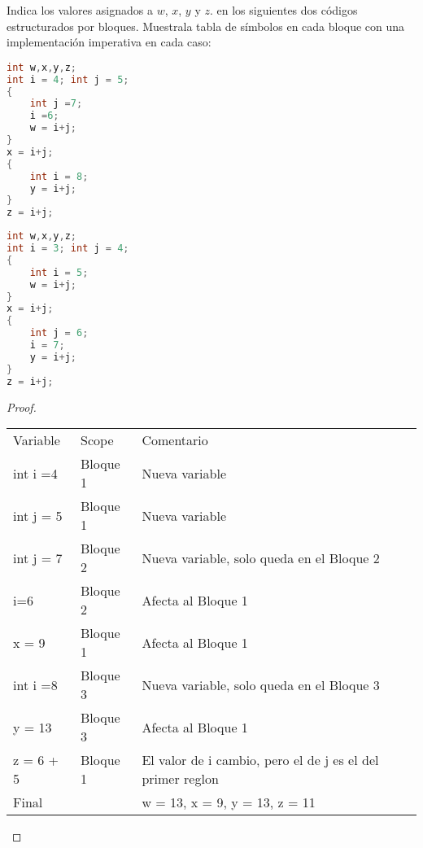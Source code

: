 \begin{Pro}
Indica los valores asignados a $w$, $x$, $y$ y $z$. en los siguientes dos códigos estructurados por bloques.
Muestrala tabla de símbolos en cada bloque con una implementación imperativa en cada caso:
\end{Pro}

\begin{multicols}{2}
\begin{lstlisting}[language=C++]
int w,x,y,z;
int i = 4; int j = 5;
{
    int j =7;
    i =6; 
    w = i+j;
}
x = i+j;
{
    int i = 8;
    y = i+j;
}
z = i+j;
\end{lstlisting}
\begin{lstlisting}[language=C++]
int w,x,y,z;
int i = 3; int j = 4;
{
    int i = 5;
    w = i+j;
}
x = i+j;
{
    int j = 6;
    i = 7;
    y = i+j;
}
z = i+j;
\end{lstlisting}

\end{multicols}
\begin{proof}
    \hspace{5mm}

\begin{table}[h!]
\begin{tabular}{lll}
Variable                    & Scope    & Comentario                                                 \\
int i =4                    & Bloque 1 & Nueva variable                                             \\
int j = 5                   & Bloque 1 & Nueva variable                                             \\
int j = 7                   & Bloque 2 & Nueva variable, solo queda en el Bloque 2                  \\ 
i=6                         & Bloque 2 & Afecta al Bloque 1                                         \\
x = 9                       & Bloque 1 & Afecta al Bloque 1                                         \\
int i =8                    & Bloque 3 & Nueva variable, solo queda en el Bloque 3                  \\
y = 13                      & Bloque 3 & Afecta al Bloque 1                                         \\
z = 6 + 5                   & Bloque 1 & El valor de i cambio, pero el de j es el del primer reglon \\
Final                       &          & w = 13, x = 9, y = 13, z = 11                             
\end{tabular}
\end{table}
\end{proof}
